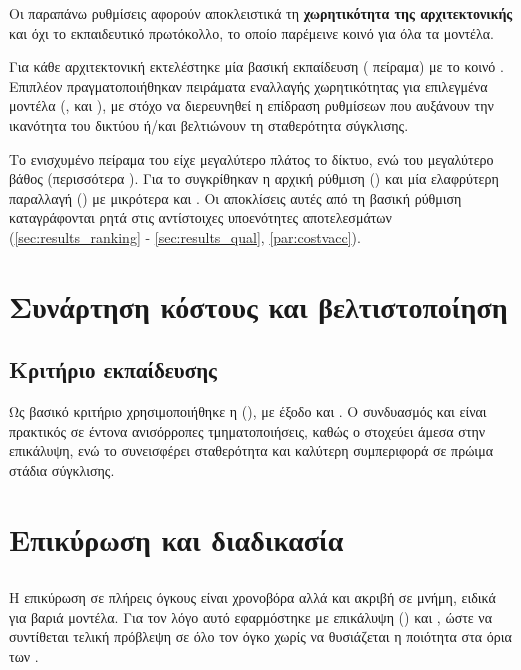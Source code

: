 Οι παραπάνω ρυθμίσεις αφορούν αποκλειστικά τη \textbf{χωρητικότητα της αρχιτεκτονικής}
και όχι το εκπαιδευτικό πρωτόκολλο, το οποίο παρέμεινε κοινό για όλα τα μοντέλα.

Για κάθε αρχιτεκτονική εκτελέστηκε μία βασική εκπαίδευση
( πείραμα) με το κοινό .
Επιπλέον πραγματοποιήθηκαν πειράματα εναλλαγής χωρητικότητας για επιλεγμένα μοντέλα (,  και ), με στόχο να
διερευνηθεί η επίδραση ρυθμίσεων που αυξάνουν την ικανότητα του δικτύου ή/και
βελτιώνουν τη σταθερότητα σύγκλισης.

Το ενισχυμένο πείραμα του  είχε μεγαλύτερο πλάτος το δίκτυο, 
ενώ του  μεγαλύτερο βάθος (περισσότερα ).
Για το  συγκρίθηκαν η αρχική ρύθμιση () και μία
ελαφρύτερη παραλλαγή () με μικρότερα  και
.
Οι αποκλίσεις αυτές από τη βασική ρύθμιση καταγράφονται ρητά στις αντίστοιχες
υποενότητες αποτελεσμάτων (\ref{sec:results_ranking} - \ref{sec:results_qual}, \ref{par:costvacc}).

\section{Συνάρτηση κόστους και βελτιστοποίηση}
\label{sec:proto_scheduler}

\subsection{Κριτήριο εκπαίδευσης}
Ως βασικό κριτήριο χρησιμοποιήθηκε η  (),
με  έξοδο και . Ο συνδυασμός
 και  είναι πρακτικός σε έντονα ανισόρροπες τμηματοποιήσεις,
καθώς ο  στοχεύει άμεσα στην επικάλυψη, ενώ το  συνεισφέρει
σταθερότητα και καλύτερη συμπεριφορά  σε πρώιμα στάδια σύγκλισης.

\section{Επικύρωση και διαδικασία }
\label{sec:proto_validation}

\subsection{}
Η επικύρωση σε πλήρεις  όγκους είναι χρονοβόρα αλλά και ακριβή σε μνήμη, ειδικά για
βαριά μοντέλα. Για τον λόγο αυτό εφαρμόστηκε 
με επικάλυψη () και , ώστε να συντίθεται
τελική πρόβλεψη σε όλο τον όγκο χωρίς να θυσιάζεται η ποιότητα στα όρια των
.

